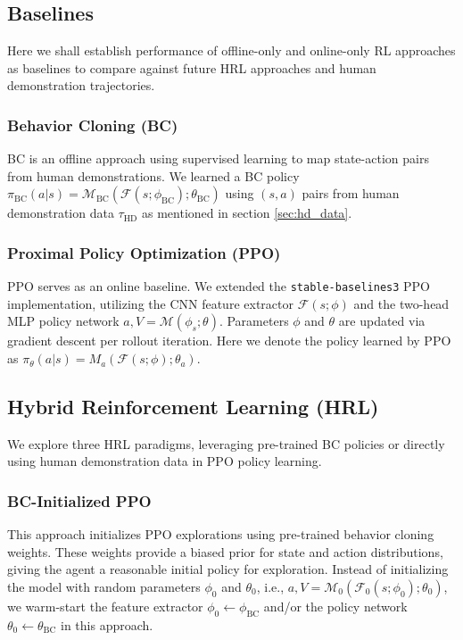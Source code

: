 \documentclass{article}
\begin{document}
\subsection{Baselines}
Here we shall establish performance of offline-only and online-only RL approaches
as baselines to compare against future HRL approaches and human demonstration trajectories. 

\subsubsection{Behavior Cloning (BC)} 
BC is an offline approach using supervised 
learning to map state-action pairs from human demonstrations. We learned 
a BC policy $\pi_{\text{BC}}(a|s) =
\mathcal{M}_{\text{BC}}(\mathcal{F}(s;\phi_{\text{BC}});\theta_{\text{BC}})$
using $(s,a)$ pairs from human demonstration data $\tau_{\text{HD}}$ as mentioned
in section \ref{sec:hd_data}.

\subsubsection{Proximal Policy Optimization (PPO)} 
PPO serves as an online baseline. We extended the 
\texttt{stable-baselines3} PPO implementation, utilizing the 
CNN feature extractor $\mathcal{F}(s;\phi)$ and the two-head 
MLP policy network $a, V = \mathcal{M}(\phi_s; \theta)$. 
Parameters $\phi$ and $\theta$ are updated via gradient 
descent per rollout iteration.
Here we denote the policy learned by PPO as 
$\pi_\theta(a|s) = M_a(\mathcal{F}(s;\phi);\theta_a)$.


\subsection{Hybrid Reinforcement Learning (HRL)}
We explore three HRL paradigms, leveraging pre-trained BC policies or 
directly using human demonstration data in PPO policy learning.

\subsubsection{BC-Initialized PPO}
This approach initializes PPO explorations using pre-trained behavior 
cloning weights. These weights provide a biased prior for state and 
action distributions, giving the agent a reasonable initial policy 
for exploration. 
Instead of initializing the model with random parameters 
$\phi_0$ and $\theta_0$, i.e., $a, V = \mathcal{M}_0(\mathcal{F}_0(s;\phi_0); 
\theta_0)$, we warm-start the feature extractor $\phi_0 \leftarrow 
\phi_{\text{BC}}$ and/or the policy network $\theta_0 \leftarrow 
\theta_{\text{BC}}$ in this approach.
\end{document}
